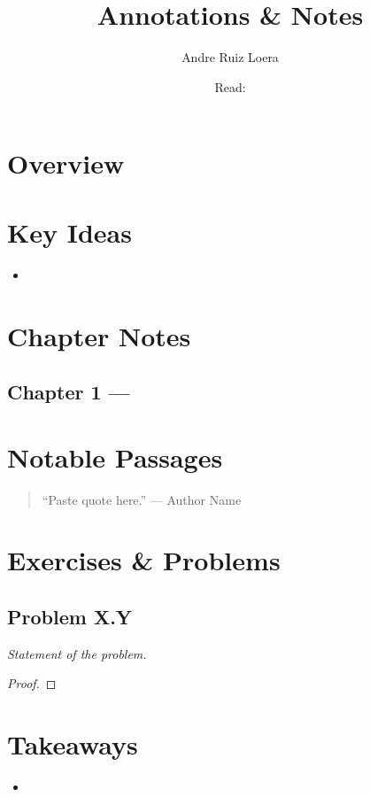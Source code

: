 \documentclass[11pt, letterpaper]{article}
\title{\booktitle \\ \large Annotations \& Notes}
\author{Andre Ruiz Loera \\ \small \textit{\category}}
\date{Read: \dateread}
\theoremstyle{definition}
\theoremstyle{remark}
\newcommand{\bookauthor}{Author Name}
\begin{document}
\maketitle
\tableofcontents
\newpage

\section{Overview}


\section{Key Ideas}
\begin{itemize}
  \item
\end{itemize}

\section{Chapter Notes}

\subsection{Chapter 1 — }


\section{Notable Passages}
\begin{quote}
  ``Paste quote here.'' \hfill --- \bookauthor
\end{quote}

\section{Exercises \& Problems}

\subsection*{Problem X.Y}
\textit{Statement of the problem.}

\begin{proof}
\end{proof}

\section{Takeaways}
\begin{itemize}
  \item
\end{itemize}
\end{document}
